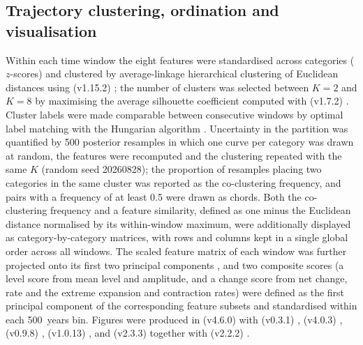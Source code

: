 \documentclass[12pt]{article}
\begin{document}
\subsection{Trajectory clustering, ordination and visualisation}
Within each time window the eight features were standardised across categories
($z$-scores) and clustered by average-linkage hierarchical clustering of
Euclidean distances using  (v1.15.2) \parencite{virtanen2020};
the number of clusters was selected between $K = 2$ and $K = 8$ by maximising the
average silhouette coefficient \parencite{rousseeuw1987} computed with
 (v1.7.2) \parencite{pedregosa2011}. Cluster labels were
made comparable between consecutive windows by optimal label matching with the
Hungarian algorithm \parencite{kuhn1955}. Uncertainty in the partition was
quantified by 500 posterior resamples in which one curve per category was drawn
at random, the features were recomputed and the clustering repeated with the same
$K$ (random seed 20260828); the proportion of resamples placing two categories in
the same cluster was reported as the co-clustering frequency, and pairs with a
frequency of at least 0.5 were drawn as chords. Both the co-clustering frequency
and a feature similarity, defined as one minus the Euclidean distance normalised
by its within-window maximum, were additionally displayed as category-by-category
matrices, with rows and columns kept in a single global order across all windows. The scaled feature matrix of each
window was further projected onto its first two principal components
\parencite{pedregosa2011}, and two composite scores (a level score from mean
level and amplitude, and a change score from net change, rate and the extreme
expansion and contraction rates) were defined as the first principal component of
the corresponding feature subsets and standardised within each \SI{500}{years}
bin. Figures were produced in  (v4.6.0) \parencite{rcoreteam2026}
with  (v0.3.1) \parencite{engler2025}, 
(v4.0.3) \parencite{wickham2016},  (v0.9.8)
\parencite{slowikowski2025},  (v1.0.13) \parencite{kolde2025},
and  (v2.3.3) \parencite{csardi2006} together with
 (v2.2.2) \parencite{pedersen2024}.

\printbibliography[title={References}]
\end{document}
